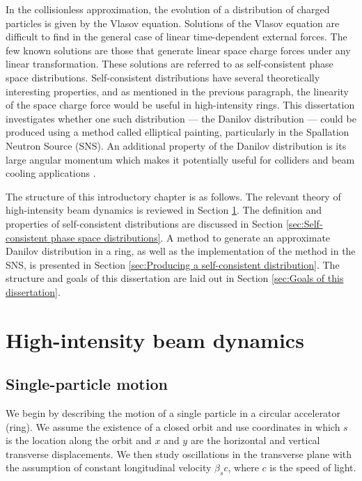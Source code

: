 In the collisionless approximation, the evolution of a distribution of charged particles is given by the Vlasov equation. Solutions of the Vlasov equation are difficult to find in the general case of linear time-dependent external forces. The few known solutions are those that generate linear space charge forces under any linear transformation. These solutions are referred to as self-consistent phase space distributions. Self-consistent distributions have several theoretically interesting properties, and as mentioned in the previous paragraph, the linearity of the space charge force would be useful in high-intensity rings. This dissertation investigates whether one such distribution — the Danilov distribution — could be produced using a method called elliptical painting, particularly in the Spallation Neutron Source (SNS). An additional property of the Danilov distribution is its large angular momentum which makes it potentially useful for colliders and beam cooling applications \cite{Burov2013}.

The structure of this introductory chapter is as follows. The relevant theory of high-intensity beam dynamics is reviewed in Section \ref{sec:High-intensity beam dynamics}. The definition and properties of self-consistent distributions are discussed in Section \ref{sec:Self-consistent phase space distributions}. A method to generate an approximate Danilov distribution in a ring, as well as the implementation of the method in the SNS, is presented in Section \ref{sec:Producing a self-consistent distribution}. The structure and goals of this dissertation are laid out in Section \ref{sec:Goals of this dissertation}.



\section{High-intensity beam dynamics}\label{sec:High-intensity beam dynamics}

\subsection{Single-particle motion}

We begin by describing the motion of a single particle in a circular accelerator (ring). We assume the existence of a closed orbit and use coordinates in which $s$ is the location along the orbit and $x$ and $y$ are the horizontal and vertical transverse displacements. We then study oscillations in the transverse plane with the assumption of constant longitudinal velocity $\beta_s c$, where $c$ is the speed of light.
 
